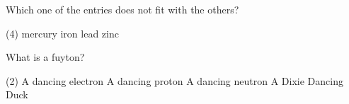 \documentclass[10pt]{article}
\begin{document}
\begin{question}
	Which one of the entries does not fit with the others?
	\begin{tasks}(4)
		\task mercury
		\task iron
		\task lead
		\task zinc
	\end{tasks}
\end{question}
\begin{question}
	What is a fuyton?
	\begin{tasks}(2)
		\task A dancing electron
		\task A dancing proton
		\task A dancing neutron
		\task A Dixie Dancing Duck
	\end{tasks}
\end{question}
\end{document}
